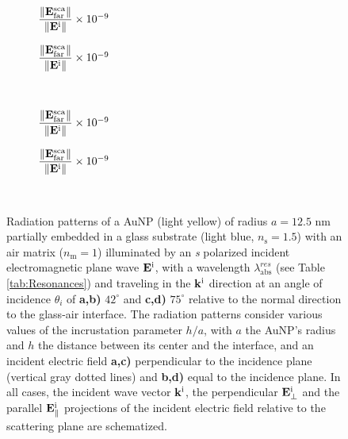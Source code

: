 \begin{figure}[h!]
    \centering
    \def\svgwidth{.8\textwidth}
    \\[-16.7em]
    \hspace*{-.2\textwidth}%
        \begin{subfigure}{.4\textwidth}\caption{%
                    \footnotesize$\dfrac{\norm{\vb{E}^\text{sca}_\text{far}}}{\norm{\vb{E}^\text{i}}} \times 10^{-9}$  }\label{sfig:Far:Inc:s:a}\end{subfigure}%
        \begin{subfigure}{.4\textwidth}\caption{%
                    \footnotesize$\dfrac{\norm{\vb{E}^\text{sca}_\text{far}}}{\norm{\vb{E}^\text{i}}} \times 10^{-9}$  }\label{sfig:Far:Inc:s:b}\end{subfigure}\\[13.75em]
    \def\svgwidth{.8\textwidth}
    \hspace*{-.21\textwidth}%
    \vspace*{-.85em}%
        \begin{subfigure}{.4\textwidth}\caption{%
                    \footnotesize$\dfrac{\norm{\vb{E}^\text{sca}_\text{far}}}{\norm{\vb{E}^\text{i}}} \times 10^{-9}$  }\label{sfig:Far:Inc:s:c}\end{subfigure}%
        \begin{subfigure}{.4\textwidth}\caption{%
                    \footnotesize$\dfrac{\norm{\vb{E}^\text{sca}_\text{far}}}{\norm{\vb{E}^\text{i}}} \times 10^{-9}$  }\label{sfig:Far:Inc:s:d}\end{subfigure}\\
    \caption[  Radiation pattern of a AuNP supported on a substrate illuminated at oblique incidence ]{%
    Radiation patterns of a AuNP (light yellow) of radius $a = 12.5$ nm partially embedded in a glass substrate (light blue, $n_\text{s} = 1.5$) with an air matrix ($n_\text{m} = 1$) illuminated by an \textit{s} polarized incident electromagnetic plane wave $\vb{E}^\text{i}$, with a wavelength $\lambda_\text{abs}^{res}$ (see Table \ref{tab:Resonances}) and traveling in the $\vb{k}^\text{i}$ direction at an angle of incidence $\theta_i$ of \textbf{a,b)} $42^\circ$ and \textbf{c,d)} $75^\circ$ relative to the normal direction to the glass-air interface. The radiation patterns consider various values of the incrustation parameter $h/a$, with $a$ the AuNP's radius and $h$ the distance between its center and the interface, and an  incident electric field \textbf{a,c)} perpendicular to the incidence plane (vertical gray dotted lines) and \textbf{b,d)} equal to the incidence plane. In all cases, the incident wave vector $\vb{k}^\text{i}$, the perpendicular $\vb{E}_\perp^\text{i}$ and the  parallel $\vb{E}_\parallel^\text{i}$ projections of the incident electric field relative to the scattering plane are schematized.%
     }
    \label{fig:Far:Inc:s}
\end{figure}

